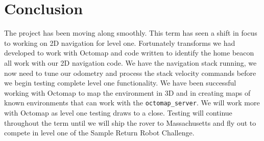 \documentclass[10pt, oneside,onecolumn]{IEEEtran}
\begin{document}
\section{Conclusion}
The project has been moving along smoothly. This term has seen a shift in focus to working on 2D navigation for level one. Fortunately transforms we had developed to work with Octomap and code written to identify the home beacon all work with our 2D navigation code. We have the navigation stack running, we now need to tune our odometry and process the stack velocity commands before we begin testing complete level one functionality. We have been successful working with Octomap to map the environment in 3D and in creating maps of known environments that can work with the \texttt{octomap\_server}. We will work more with Octomap as level one testing draws to a close. Testing will continue throughout the term until we will ship the rover to Massachusetts and fly out to compete in level one of the Sample Return Robot Challenge. 
\end{document}
